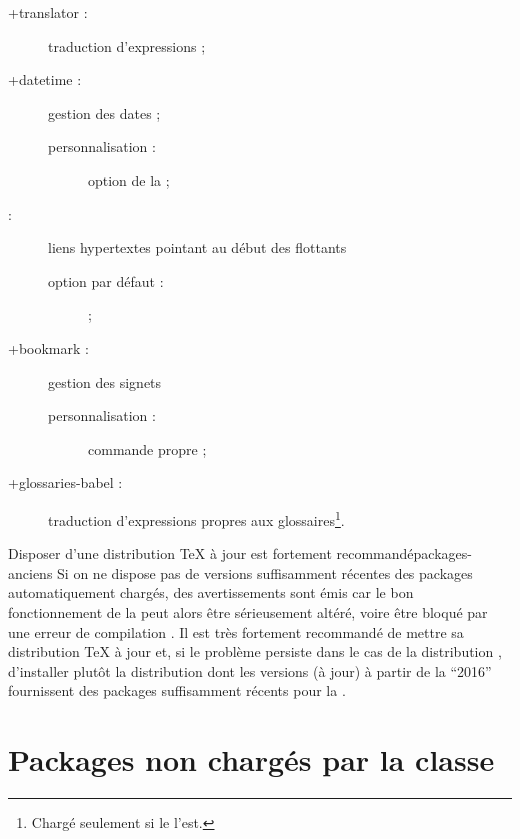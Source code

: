 \begin{description}
\item[\package*+{translator} :] traduction d'expressions ;
\item[\package+{datetime} :] gestion des dates ;
  \begin{description}
  \item[personnalisation :] option  de la \yatCl ;
  \end{description}
\item[ :] liens hypertextes pointant au début des
  flottants%
  \begin{description}
  \item[option par défaut :]  ;
  \end{description}
\item[\package+{bookmark} :] gestion des signets%
  \begin{description}
  \item[personnalisation :] commande propre  ;
  \end{description}
\item[\package*+{glossaries-babel} :] traduction d'expressions propres aux
  glossaires\footnote{Chargé seulement si le  l'est.}.
\end{description}

\begin{dbremark}{Disposer d'une distribution \TeX{} à jour est fortement
    recommandé}{packages-anciens}
  Si on ne dispose pas de versions suffisamment récentes des packages
  automatiquement chargés, des avertissements sont émis car le bon
  fonctionnement de la \yatCl{} peut alors être sérieusement altéré, voire être
  bloqué par une erreur de compilation . Il
  est très fortement recommandé de mettre sa distribution \TeX{} à jour et, si
  le problème persiste dans le cas de la distribution \miktex{},
  d'installer plutôt la distribution \texlive dont les versions (à
  jour) à partir de la \enquote{2016} fournissent des packages suffisamment
  récents pour la \yatCl.
\end{dbremark}

\section{Packages non chargés par la classe}\label{sec-packages-non-charges}

